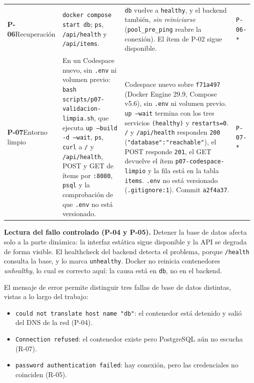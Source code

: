 \documentclass[11pt,a4paper]{article}
\newcommand{\cod}[1]{\texttt{#1}}
\newcommand{\ruta}[1]{\nolinkurl{#1}}
\begin{document}
{\begin{xltabular}{\linewidth}{@{}>{\raggedright\arraybackslash}p{2.05cm} >{\raggedright\arraybackslash}X >{\raggedright\arraybackslash}X >{\raggedright\arraybackslash}p{1.25cm}@{}}
\textbf{\sffamily P-06}\newline Recuperación & \cod{docker compose start db}; \cod{ps}, \cod{/api/health} y \cod{/api/items}. & \cod{db} vuelve a \cod{healthy}, y el backend también, \emph{sin reiniciarse} (\cod{pool\_pre\_ping} reabre la conexión). El ítem de P-02 sigue disponible. & \ruta{P-06-*} \\
\textbf{\sffamily P-07}\newline Entorno limpio & En un Codespace nuevo, sin \cod{.env} ni volumen previo: \cod{bash scripts/p07-validacion-limpia.sh}, que ejecuta \cod{up --build -d --wait}, \cod{ps}, \cod{curl} a \cod{/} y \cod{/api/health}, POST y GET de ítems por \cod{:8080}, \cod{psql} y la comprobación de que \cod{.env} no está versionado. & Codespace nuevo sobre \cod{f71a497} (Docker Engine 29.9, Compose v5.6), sin \cod{.env} ni volumen previo. \cod{up --wait} termina con los tres servicios \cod{(healthy)} y \cod{restarts=0}. \cod{/} y \cod{/api/health} responden \cod{200} (\cod{"database":"reachable"}), el POST responde \cod{201}, el GET devuelve el ítem \cod{p07-codespace-limpio} y la fila está en la tabla \cod{items}. \cod{.env} no está versionado (\cod{.gitignore:1}). Commit \cod{a2f4a37}. & \ruta{P-07-*} \\
\bottomrule
\end{xltabular}}

\textbf{Lectura del fallo controlado (P-04 y P-05).} Detener la base de datos afecta solo a la parte dinámica: la interfaz estática sigue disponible y la API se degrada de forma visible. El healthcheck del backend detecta el problema, porque \cod{/health} consulta la base, y lo marca \cod{unhealthy}. Docker no reinicia contenedores \emph{unhealthy}, lo cual es correcto aquí: la causa está en \cod{db}, no en el backend.

El mensaje de error permite distinguir tres fallas de base de datos distintas, vistas a lo largo del trabajo:

\begin{itemize}
  \item \cod{could not translate host name "db"}: el contenedor está detenido y salió del DNS de la red (P-04).
  \item \cod{Connection refused}: el contenedor existe pero PostgreSQL aún no escucha (R-07).
  \item \cod{password authentication failed}: hay conexión, pero las credenciales no coinciden (R-05).
\end{itemize}

\end{document}
